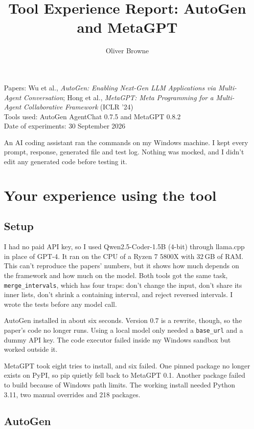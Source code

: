 \documentclass[11pt]{article}
\title{Tool Experience Report: AutoGen and MetaGPT}
\author{Oliver Browne}
\date{}
\begin{document}
\maketitle
\vspace{-1.5em}

Papers: Wu et al., \emph{AutoGen: Enabling Next-Gen LLM Applications via Multi-Agent Conversation}; Hong et al., \emph{MetaGPT: Meta Programming for a Multi-Agent Collaborative Framework} (ICLR '24)\\
Tools used: AutoGen AgentChat 0.7.5 and MetaGPT 0.8.2\\
Date of experiments: 30 September 2026

An AI coding assistant ran the commands on my Windows machine. I kept every prompt, response, generated file and test log. Nothing was mocked, and I didn't edit any generated code before testing it.

\section{Your experience using the tool}

\subsection*{Setup}

I had no paid API key, so I used Qwen2.5-Coder-1.5B (4-bit) through llama.cpp in place of GPT-4. It ran on the CPU of a Ryzen 7 5800X with 32\,GB of RAM. This can't reproduce the papers' numbers, but it shows how much depends on the framework and how much on the model. Both tools got the same task, \texttt{merge\_intervals}, which has four traps: don't change the input, don't share its inner lists, don't shrink a containing interval, and reject reversed intervals. I wrote the tests before any model call.

AutoGen installed in about six seconds. Version 0.7 is a rewrite, though, so the paper's code no longer runs. Using a local model only needed a \texttt{base\_url} and a dummy API key. The code executor failed inside my Windows sandbox but worked outside it.

MetaGPT took eight tries to install, and six failed. One pinned package no longer exists on PyPI, so pip quietly fell back to MetaGPT 0.1. Another package failed to build because of Windows path limits. The working install needed Python 3.11, two manual overrides and 218 packages.

\subsection*{AutoGen}
\end{document}
